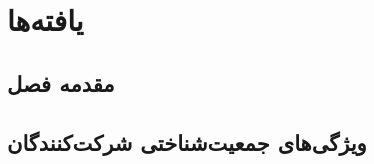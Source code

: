 \ChapterStart
\chapter{یافته‌ها}
\label{ch:results}

\section{مقدمه فصل}
\label{sec:ch4-intro}

\section{ویژگی‌های جمعیت‌شناختی شرکت‌کنندگان}
\label{sec:demographics}


